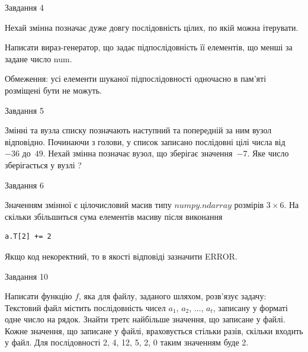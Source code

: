 \documentclass[12pt, ukrainian]{article}
\begin{document}
{\begin{minipage}[t]{8.0cm}
\begin{verbatim}
\end{verbatim}            

\end{minipage}


               
{\begin{center}Завдання {4}\end{center}}
\vspace{-4mm}
Нехай змінна  позначає дуже довгу послідовність цілих, по якій можна ітерувати.

Написати вираз-генератор, що задає підпослідовність її елементів, що менші за задане число num.

Обмеження: усі елементи шуканої підпослідовності одночасно в пам'яті розміщені бути не можуть.\par

\vspace{10mm}
               
{\begin{center}Завдання {5}\end{center}}
\vspace{-4mm}
Змінні  та  вузла списку позначають наступний та попередній за ним вузол відповідно. Починаючи з голови, у список записано послідовні цілі числа від~$-36$ до~$49$. Нехай змінна  позначає вузол, що зберігає значення~$-7$.
Яке число зберігається у вузлі  ?\par

               
{\begin{center}Завдання {6}\end{center}}
\vspace{-4mm}
Значенням змінної  є цілочисловий масив типу $numpy.ndarray$ розмірів $3{\times}6$. На скільки збільшиться сума елементів масиву  після виконання
\begin{verbatim}
a.T[2] += 2
\end{verbatim}


Якщо код некоректний, то в якості відповіді зазначити ERROR.\par

               
{\begin{center}Завдання {10}\end{center}}
\vspace{-4mm}

Написати функцію $f$, яка для файлу, заданого шляхом, розв’язує задачу:\\ Текстовий файл містить послідовність чисел $a_1$, $a_2$, $\ldots$, $a_t$, записану у форматі одне число на рядок. Знайти третє найбільше значення, що записане у файлі. Кожне значення, що записане у файлі, враховується стільки разів, скільки входить у файл. Для послідовності 2, 4, 12, 5, 2, 0 таким значенням буде 2.

}
\end{document}
